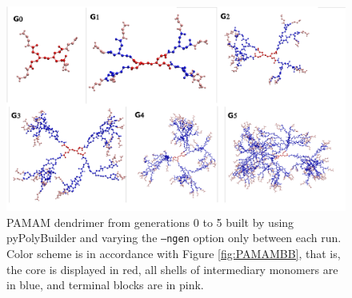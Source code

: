 \begin{figure}[ht!]
    \centering
    \includegraphics[width=\textwidth]{PAMAM/PAMAMGs.pdf}
    \caption{PAMAM dendrimer from generations 0 to 5 built by using pyPolyBuilder and varying the \texttt{--ngen} option only between each run.
    Color scheme is in accordance with Figure \ref{fig:PAMAMBB}, that is, the core is displayed in red, all shells of intermediary monomers are in blue, and terminal blocks are in pink.}
    \label{fig:PAMAMGS}
\end{figure}